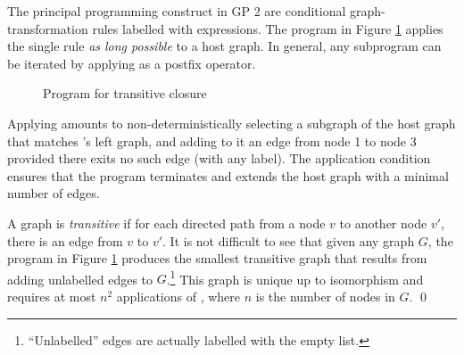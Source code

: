 \begin{example}
The principal programming construct in GP 2 are conditional graph-transformation rules labelled with expressions. The program in Figure \ref{fig:transitive-closure} applies the single rule  \emph{as long possible} to a host graph. In general, any subprogram can be iterated by applying \ttt{!} as a postfix operator.

\begin{figure}[htb]
\begin{center}
 
\end{center}
\caption{Program for transitive closure}\label{fig:transitive-closure}
\end{figure}

Applying  amounts to non-deterministically selecting a subgraph of the host graph that matches 's left graph, and adding to it an edge from node 1 to node 3 provided there exits no such edge (with any label). The application condition ensures that the program terminates and extends the host graph with a minimal number of edges.

A graph is \emph{transitive} if for each directed path from a node $v$ to another node $v'$, there is an edge from $v$ to $v'$. It is not difficult to see that given any graph $G$, the program in Figure \ref{fig:transitive-closure} produces the smallest transitive graph that results from adding unlabelled edges to $G$.\footnote{``Unlabelled'' edges are actually labelled with the empty list.} This graph is unique up to isomorphism and requires at most $n^2$ applications of , where $n$\/ is the number of nodes in $G$. \qed
\end{example}
  


